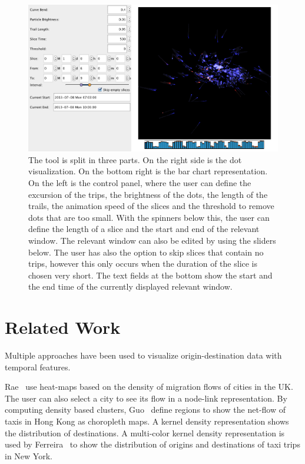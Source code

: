 \begin{figure}[ht!]
\centering
\includegraphics[width=0.9\linewidth]{images/tool.png}
\caption{The tool is split in three parts. On the right side is the
dot visualization. On the bottom right is the bar chart representation.
On the left is the control panel,
where the user can define the excursion of the trips, the brightness of
the dots, the length of the trails, the animation speed of the slices
and the threshold to remove dots that are too small.
With the spinners below this, the user can define the length of a slice and
the start and end of the relevant window.
The relevant window can also be edited by using the sliders below.
The user has also the option to skip slices that contain no trips, however
this only occurs when the duration of the slice is chosen very short.
The text fields at the bottom show the start and the end time of the
currently displayed relevant window.
}
\label{fig:tool}
\end{figure}

\section{Related Work}
\label{sec:rel}
Multiple approaches have been used
to visualize origin-destination data with temporal features.

Rae~\cite{Rae2009} use heat-maps based on
the density of migration flows of cities in the UK.
The user can also select a city to see its flow
in a node-link representation.
By computing density based clusters,
Guo~\etal\cite{Guo2012} define regions
to show the net-flow of taxis in Hong Kong
as choropleth maps.
A kernel density representation shows
the distribution of destinations.
A multi-color kernel density representation is
used by Ferreira~\etal\cite{Ferreira2013}
to show the distribution of
origins and destinations of taxi trips in New York.


